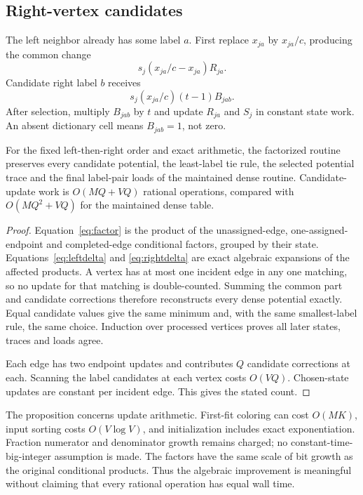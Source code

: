 \documentclass[11pt,letterpaper]{article}
\theoremstyle{remark}\newtheorem{remark}[theorem]{Remark}
\begin{document}
\subsection{Right-vertex candidates}
The left neighbor already has some label $a$. First replace $x_{ja}$ by $x_{ja}/c$, producing the common change
\[
 s_j(x_{ja}/c-x_{ja})R_{ja}.
\]
Candidate right label $b$ receives
\begin{equation}\label{eq:rightdelta}
 s_j(x_{ja}/c)(t-1)B_{jab}.
\end{equation}
After selection, multiply $B_{jab}$ by $t$ and update $R_{ja}$ and $S_j$ in constant state work. An absent dictionary cell means $B_{jab}=1$, not zero.

\begin{proposition}\label{prop:matching}
For the fixed left-then-right order and exact arithmetic, the factorized routine preserves every candidate potential, the least-label tie rule, the selected potential trace and the final label-pair loads of the maintained dense routine. Candidate-update work is $O(MQ+VQ)$ rational operations, compared with $O(MQ^2+VQ)$ for the maintained dense table.
\end{proposition}
\begin{proof}
Equation~\eqref{eq:factor} is the product of the unassigned-edge, one-assigned-endpoint and completed-edge conditional factors, grouped by their state. Equations~\eqref{eq:leftdelta} and \eqref{eq:rightdelta} are exact algebraic expansions of the affected products. A vertex has at most one incident edge in any one matching, so no update for that matching is double-counted. Summing the common part and candidate corrections therefore reconstructs every dense potential exactly. Equal candidate values give the same minimum and, with the same smallest-label rule, the same choice. Induction over processed vertices proves all later states, traces and loads agree.

Each edge has two endpoint updates and contributes $Q$ candidate corrections at each. Scanning the label candidates at each vertex costs $O(VQ)$. Chosen-state updates are constant per incident edge. This gives the stated count.
\end{proof}

The proposition concerns update arithmetic. First-fit coloring can cost $O(MK)$, input sorting costs $O(V\log V)$, and initialization includes exact exponentiation. Fraction numerator and denominator growth remains charged; no constant-time-big-integer assumption is made. The factors have the same scale of bit growth as the original conditional products. Thus the algebraic improvement is meaningful without claiming that every rational operation has equal wall time.
\end{document}
